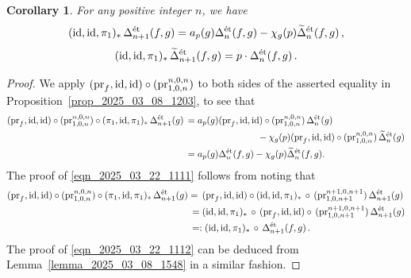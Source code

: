 \documentclass{amsart}
\numberwithin{equation}{section}
\newtheorem{corollary}[theorem]{Corollary}
\newcommand{\id}{\mathrm{id}}
\newcommand{\etale}{\textup{\'et}}
\begin{document}
\begin{corollary}
        \label{cor_2025_03_22_0955}
    For any positive integer $n$, we have
    \begin{equation}
    \label{eqn_2025_03_22_1111}
        ({\rm id}, {\rm id},\pi_1)_*\,\Delta_{n+1}^{\etale}(f, g)=a_p(g) \Delta_{n}^{\etale}(f,g)-\chi_g(p)\widetilde{\Delta}_{n}^{\etale}(f,g)\,,
    \end{equation}
        \begin{equation}
    \label{eqn_2025_03_22_1112}
        ({\rm id}, {\rm id},\pi_1)_*\,\widetilde\Delta_{n+1}^{\etale}(f, g)=p\cdot \Delta_{n} ^{\etale}(f,g)\,.
    \end{equation}
\end{corollary}


\begin{proof}
    We apply $({\rm pr}_{f},\id,\id)\circ ({\rm pr}^{n,0,n}_{1,0,n})$ to both sides of the asserted equality in Proposition~\ref{prop_2025_03_08_1203}, to see that
    \begin{align*}
        ({\rm pr}_{f},\id,\id)\circ ({\rm pr}^{n,0,n}_{1,0,n})\circ(\pi_1, {\rm id},\pi_1)_*\,\Delta_{n+1}^{\etale}(g)&\,=a_p(g)({\rm pr}_{f},\id,\id)\circ ({\rm pr}^{n,0,n}_{1,0,n})\, \Delta_{n}^{\etale}(g)\\
        &\qquad\qquad\qquad \qquad  -\chi_g(p)({\rm pr}_{f},\id,\id)\circ ({\rm pr}^{n,0,n}_{1,0,n})\,\widetilde{\Delta}_{n}^{\etale}(g)\\
        &\,=a_p(g) \Delta_{n}^{\etale}(f,g)-\chi_g(p)\widetilde{\Delta}_{n}^{\etale}(f,g).
    \end{align*}
    The proof of \eqref{eqn_2025_03_22_1111} follows from noting that 
    \begin{align*}
    ({\rm pr}_{f},\id,\id)\circ ({\rm pr}^{n,0,n}_{1,0,n})\circ(\pi_1, {\rm id},\pi_1)_*\,\Delta_{n+1}^{\etale}(g)&=\, ({\rm pr}_{f},\id,\id)\circ({\rm id}, {\rm id},\pi_1)_*\,\circ \, ({\rm pr}^{n+1,0,n+1}_{1,0,n+1})\,\Delta_{n+1}^{\etale}(g)\\
    &\,=({\rm id}, {\rm id},\pi_1)_*\,\circ\,({\rm pr}_{f},\id,\id)\circ \, ({\rm pr}^{n+1,0,n+1}_{1,0,n+1})\,\Delta_{n+1}^{\etale}(g)\\
    &\,=:({\rm id}, {\rm id},\pi_1)_*\,\circ\,\Delta_{n+1}^{\etale}(f,g)\,.
        \end{align*}
        The proof of \eqref{eqn_2025_03_22_1112} can be deduced from Lemma~\ref{lemma_2025_03_08_1548} in a similar fashion.
\end{proof}
\end{document}
